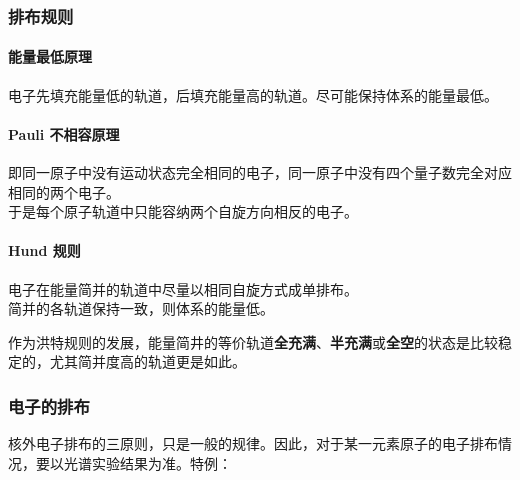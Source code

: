 \subsubsection{排布规则}

\paragraph{能量最低原理}
电子先填充能量低的轨道，后填充能量高的轨道。尽可能保持体系的能量最低。

\paragraph{Pauli 不相容原理}
即同一原子中没有运动状态完全相同的电子，同一原子中没有四个量子数完全对应相同的两个电子。\\
于是每个原子轨道中只能容纳两个自旋方向相反的电子。

\paragraph{Hund 规则}
电子在能量简并的轨道中尽量以相同自旋方式成单排布。\\
简并的各轨道保持一致，则体系的能量低。

作为洪特规则的发展，能量简井的等价轨道\textbf{全充满}、\textbf{半充满}或\textbf{全空}的状态是比较稳定的，尤其简并度高的轨道更是如此。

\subsubsection{电子的排布}
核外电子排布的三原则，只是一般的规律。因此，对于某一元素原子的电子排布情况，要以光谱实验结果为准。特例：


